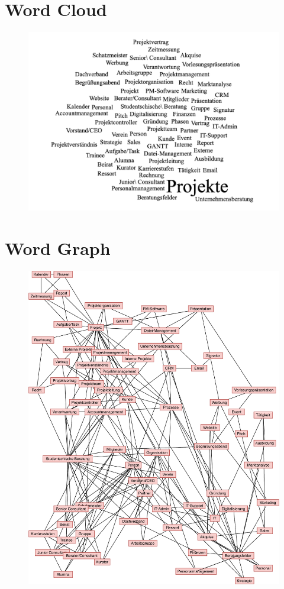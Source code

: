 \documentclass[a4paper, DIV=13, BCOR=0cm]{scrbook}
\begin{document}
\section{Word Cloud}
\label{word-cloud}
\begin{figure}[h]
	\centering
	\includegraphics[width=\textwidth]{Images/word-cloud.png}
\end{figure}
\clearpage

\section{Word Graph}
\label{word-graph}
\begin{figure}[h!]
	\centering
	\includegraphics[height=0.9\textheight, width=1\textwidth]{Diagrams/word-graph.pdf}
\end{figure}
\clearpage
\end{document}
